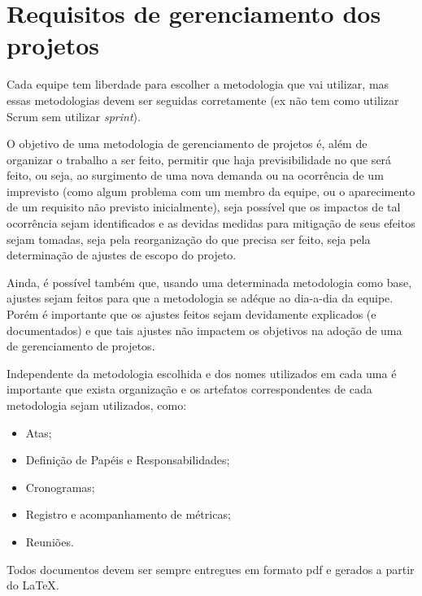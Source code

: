 \chapter{Requisitos de gerenciamento dos projetos}


Cada equipe tem liberdade para escolher a metodologia que vai utilizar, mas essas metodologias devem ser seguidas corretamente (ex não tem como utilizar Scrum sem utilizar \emph{sprint}).

O objetivo de uma metodologia de gerenciamento de projetos é, além de organizar o trabalho a ser feito, permitir que haja previsibilidade no que será feito, ou seja, ao surgimento de uma nova demanda ou na ocorrência de um imprevisto (como algum problema com um membro da equipe, ou o aparecimento de um requisito não previsto inicialmente), seja possível que os impactos de tal ocorrência sejam identificados e as devidas medidas para mitigação de seus efeitos sejam tomadas, seja pela reorganização do que precisa ser feito, seja pela determinação de ajustes de escopo do projeto.

Ainda, é possível também que, usando uma determinada metodologia como base, ajustes sejam feitos para que a metodologia se adéque ao dia-a-dia da equipe. Porém é importante que os ajustes feitos sejam devidamente explicados (e documentados) e que tais ajustes não impactem os objetivos na adoção de uma de gerenciamento de projetos.

Independente da metodologia escolhida e dos nomes utilizados em cada uma é importante que exista organização e os artefatos correspondentes de cada metodologia sejam utilizados, como:
\begin{itemize}
    \item Atas;
    
    \item Definição de Papéis e Responsabilidades;
    
    \item Cronogramas;
    
    \item Registro e acompanhamento de métricas;
    
    \item Reuniões.
\end{itemize}

Todos documentos devem ser sempre entregues em formato \ac{pdf} e gerados a partir do \LaTeX.















